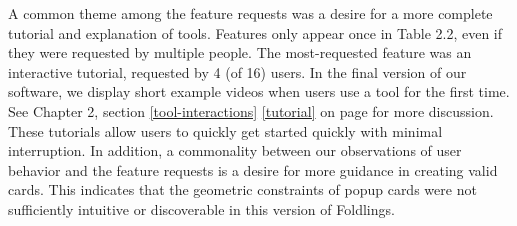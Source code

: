 A common theme among the feature requests was a desire for a more
complete tutorial and explanation of tools. Features only appear once in
Table 2.2, even if they were requested by multiple people. The
most-requested feature was an interactive tutorial, requested by 4 (of
16) users. In the final version of our software, we display short
example videos when users use a tool for the first time. See Chapter 2,
section \ref{tool-interactions} \ref{tutorial}  on
page \pageref{tutorial} for more discussion. These tutorials allow users
to quickly get started quickly with minimal interruption. In addition, a
commonality between our observations of user behavior and the feature
requests is a desire for more guidance in creating valid cards. This
indicates that the geometric constraints of popup cards were not
sufficiently intuitive or discoverable in this version of Foldlings.

